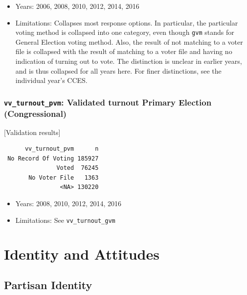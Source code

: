\documentclass[10pt,article,oneside]{memoir}
\theoremstyle{definition}
\begin{document}
\begin{itemize}
\tightlist
\item
  Years: 2006, 2008, 2010, 2012, 2014, 2016
\item
  Limitations: Collapses most response options. In particular, the
  particular voting method is collapsed into one category, even though
  \texttt{gvm} stands for General Election voting method. Also, the
  result of not matching to a voter file is collapsed with the result of
  matching to a voter file and having no indication of turning out to
  vote. The distinction is unclear in earlier years, and is thus
  collapsed for all years here. For finer distinctions, see the
  individual year's CCES.
\end{itemize}

\hypertarget{vv_turnout_pvm-validated-turnout-primary-election-congressional}{%
\subsubsection{\texorpdfstring{\texttt{vv\_turnout\_pvm}: Validated
turnout Primary Election
(Congressional)}{vv\_turnout\_pvm: Validated turnout Primary Election (Congressional)}}\label{vv_turnout_pvm-validated-turnout-primary-election-congressional}}

{[}Validation results{]}

\begin{verbatim}
      vv_turnout_pvm      n
 No Record Of Voting 185927
               Voted  76245
       No Voter File   1363
                <NA> 130220
\end{verbatim}

\begin{itemize}
\tightlist
\item
  Years: 2008, 2010, 2012, 2014, 2016
\item
  Limitations: See \texttt{vv\_turnout\_gvm}
\end{itemize}

\newpage

\hypertarget{identity-and-attitudes}{%
\section{Identity and Attitudes}\label{identity-and-attitudes}}

\hypertarget{partisan-identity}{%
\subsection{Partisan Identity}\label{partisan-identity}}
\end{document}
